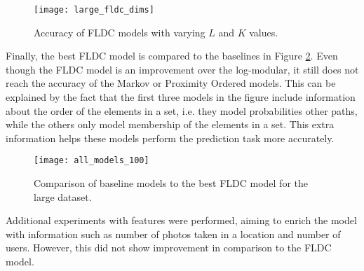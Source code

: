 \begin{figure}
  \centering
  \texttt{[image: large\_fldc\_dims]}
  \caption{Accuracy of FLDC models with varying $L$ and $K$ values.}
  \label{fig:grid_search_large}
\end{figure}

Finally, the best FLDC model is compared to the baselines in Figure \ref{fig:all_models_100}. Even though the FLDC model is an improvement over the log-modular, it still does not reach the accuracy of the Markov or Proximity Ordered models. This can be explained by the fact that the first three models in the figure include information about the order of the elements in a set, i.e. they model probabilities other paths, while the others only model membership of the elements in a set. This extra information helps these models perform the prediction task more accurately.

\begin{figure}
  \centering
  \texttt{[image: all\_models\_100]}
  \caption{Comparison of baseline models to the best FLDC model for the large dataset.}
  \label{fig:all_models_100}
\end{figure}

Additional experiments with features were performed, aiming to enrich the model with information such as number of photos taken in a location and number of users. However, this did not show improvement in comparison to the FLDC model.